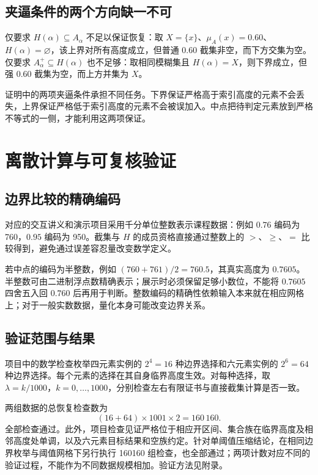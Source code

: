 \documentclass[UTF8,fontset=fandol,zihao=-4,a4paper]{ctexart}
\numberwithin{equation}{section}
\theoremstyle{reportplain}
\newcommand{\muA}{\mu_A}
\newcommand{\cut}[1]{A_{#1}}
\newcommand{\scut}[1]{A_{#1}^{+}}
\newcommand{\set}[1]{\{#1\}}
\newcommand{\eqtag}[1]{\label{#1}}
\begin{document}
\subsection{夹逼条件的两个方向缺一不可}
仅要求 $H(\alpha)\subseteq\cut{\alpha}$ 不足以保证恢复：取 $X=\set{x}$、$\muA(x)=0.60$、$H(\alpha)=\varnothing$，该上界对所有高度成立，但普通 $0.60$ 截集非空，而下方交集为空。仅要求 $\scut{\alpha}\subseteq H(\alpha)$ 也不足够：取相同模糊集且 $H(\alpha)=X$，则下界成立，但强 $0.60$ 截集为空，而上方并集为 $X$。

证明中的两项夹逼条件承担不同任务。下界保证严格高于索引高度的元素不会丢失，上界保证严格低于索引高度的元素不会被误加入。中点把待判定元素放到严格不等式的一侧，才能利用这两项保证。

\section{离散计算与可复核验证}
\subsection{边界比较的精确编码}
对应的交互讲义和演示项目\cite{project}采用千分单位整数表示课程数据：例如 $0.76$ 编码为 760，$0.95$ 编码为 950。截集与 $H$ 的成员资格直接通过整数上的 $>$、$\ge$、$=$ 比较得到，避免通过误差容忍量改变数学定义。

若中点的编码为半整数，例如 $(760+761)/2=760.5$，其真实高度为 $0.7605$。半整数可由二进制浮点数精确表示；展示时必须保留足够小数位，不能将 $0.7605$ 四舍五入回 $0.760$ 后再用于判断。整数编码的精确性依赖输入本来就在相应网格上；对于一般实数数据，量化本身可能改变边界关系。

\subsection{验证范围与结果}
项目中的数学检查枚举四元素实例的 $2^4=16$ 种边界选择和六元素实例的 $2^6=64$ 种边界选择。每个元素的选择在其自身临界高度生效。对每种选择，取 $\lambda=k/1000$，$k=0,\ldots,1000$，分别检查左右有限证书与直接截集计算是否一致。

两组数据的总恢复检查数为
\begin{equation}
(16+64)\times1001\times2=160\,160.
\eqtag{eq:case-count}
\end{equation}
全部检查通过。此外，项目检查见证严格位于相应开区间、集合族在临界高度及相邻高度处单调，以及六元素目标结果和空族约定。针对单阈值压缩结论，在相同边界枚举与阈值网格下另行执行 160160 组检查，也全部通过；两项计数对应不同的验证过程，不能作为不同数据规模相加。验证方法见附录。
\end{document}
